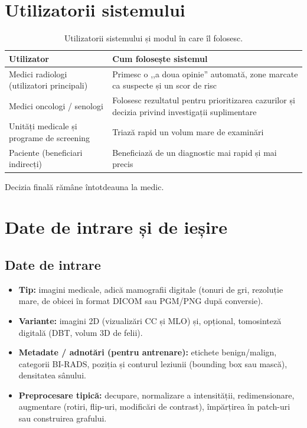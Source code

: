 \documentclass[runningheads,a4paper,11pt]{report}
\begin{document}
\section{Utilizatorii sistemului}
\label{section:users}

\begin{table}[htbp]
	\caption{Utilizatorii sistemului și modul în care îl folosesc.}
	\label{tab:users}
	\begin{center}
		\begin{tabular}{p{5cm}p{10cm}}
			\textbf{Utilizator} & \textbf{Cum folosește sistemul} \\
			\hline\hline
			Medici radiologi (utilizatori principali) & Primesc o ,,a doua opinie'' automată, zone marcate ca suspecte și un scor de risc \\
			Medici oncologi / senologi & Folosesc rezultatul pentru prioritizarea cazurilor și decizia privind investigații suplimentare \\
			Unități medicale și programe de screening & Triază rapid un volum mare de examinări \\
			Paciente (beneficiari indirecți) & Beneficiază de un diagnostic mai rapid și mai precis \\
		\end{tabular}
	\end{center}
\end{table}

Decizia finală rămâne întotdeauna la medic.

\section{Date de intrare și de ieșire}
\label{section:io}

\subsection{Date de intrare}

\begin{itemize}
	\item \textbf{Tip:} imagini medicale, adică mamografii digitale (tonuri de gri, rezoluție mare, de obicei în format DICOM sau PGM/PNG după conversie).
	\item \textbf{Variante:} imagini 2D (vizualizări CC și MLO) și, opțional, tomosinteză digitală (DBT, volum 3D de felii).
	\item \textbf{Metadate / adnotări (pentru antrenare):} etichete benign/malign, categorii BI-RADS, poziția și conturul leziunii (bounding box sau mască), densitatea sânului.
	\item \textbf{Preprocesare tipică:} decupare, normalizare a intensității, redimensionare, augmentare (rotiri, flip-uri, modificări de contrast), împărțirea în patch-uri sau construirea grafului.
\end{itemize}
\end{document}
